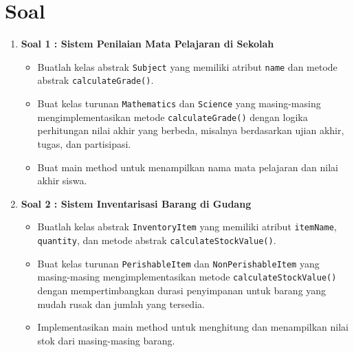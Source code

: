 \section{Soal}

\begin{enumerate}
	
	\item \textbf{Soal 1 : Sistem Penilaian Mata Pelajaran di Sekolah}
	\begin{itemize}
		\item Buatlah kelas abstrak \texttt{Subject} yang memiliki atribut \texttt{name} dan metode abstrak \texttt{calculateGrade()}.
		\item Buat kelas turunan \texttt{Mathematics} dan \texttt{Science} yang masing-masing mengimplementasikan metode \texttt{calculateGrade()} dengan logika perhitungan nilai akhir yang berbeda, misalnya berdasarkan ujian akhir, tugas, dan partisipasi.
		\item Buat main method untuk menampilkan nama mata pelajaran dan nilai akhir siswa.
	\end{itemize}
	
	\item \textbf{Soal 2 : Sistem Inventarisasi Barang di Gudang}
	\begin{itemize}
		\item Buatlah kelas abstrak \texttt{InventoryItem} yang memiliki atribut \texttt{itemName}, \texttt{quantity}, dan metode abstrak \texttt{calculateStockValue()}.
		\item Buat kelas turunan \texttt{PerishableItem} dan \texttt{NonPerishableItem} yang masing-masing mengimplementasikan metode \texttt{calculateStockValue()} dengan mempertimbangkan durasi penyimpanan untuk barang yang mudah rusak dan jumlah yang tersedia.
		\item Implementasikan main method untuk menghitung dan menampilkan nilai stok dari masing-masing barang.
	\end{itemize}
	
\end{enumerate}